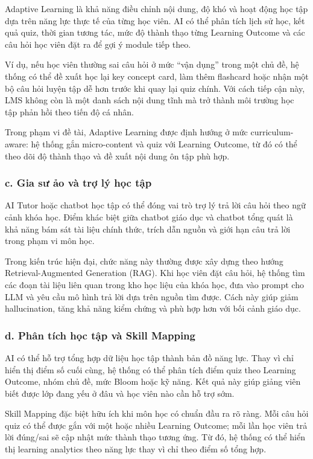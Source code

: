 Adaptive Learning là khả năng điều chỉnh nội dung, độ khó và hoạt động học tập
dựa trên năng lực thực tế của từng học viên. AI có thể phân tích lịch sử học,
kết quả quiz, thời gian tương tác, mức độ thành thạo từng Learning Outcome và
các câu hỏi học viên đặt ra để gợi ý module tiếp theo.

Ví dụ, nếu học viên thường sai câu hỏi ở mức ``vận dụng'' trong một chủ đề, hệ
thống có thể đề xuất học lại key concept card, làm thêm flashcard hoặc nhận một
bộ câu hỏi luyện tập dễ hơn trước khi quay lại quiz chính. Với cách tiếp cận
này, LMS không còn là một danh sách nội dung tĩnh mà trở thành môi trường học
tập phản hồi theo tiến độ cá nhân.

Trong phạm vi đề tài, Adaptive Learning được định hướng ở mức
curriculum-aware: hệ thống gắn micro-content và quiz với Learning Outcome, từ
đó có thể theo dõi độ thành thạo và đề xuất nội dung ôn tập phù hợp.

\subsubsection*{c. Gia sư ảo và trợ lý học tập}

AI Tutor hoặc chatbot học tập có thể đóng vai trò trợ lý trả lời câu hỏi theo
ngữ cảnh khóa học. Điểm khác biệt giữa chatbot giáo dục và chatbot tổng quát là
khả năng bám sát tài liệu chính thức, trích dẫn nguồn và giới hạn câu trả lời
trong phạm vi môn học.

Trong kiến trúc hiện đại, chức năng này thường được xây dựng theo hướng
Retrieval-Augmented Generation (RAG). Khi học viên đặt câu hỏi, hệ thống tìm
các đoạn tài liệu liên quan trong kho học liệu của khóa học, đưa vào prompt cho
LLM và yêu cầu mô hình trả lời dựa trên nguồn tìm được. Cách này giúp giảm
hallucination, tăng khả năng kiểm chứng và phù hợp hơn với bối cảnh giáo dục.

\subsubsection*{d. Phân tích học tập và Skill Mapping}

AI có thể hỗ trợ tổng hợp dữ liệu học tập thành bản đồ năng lực. Thay vì chỉ
hiển thị điểm số cuối cùng, hệ thống có thể phân tích điểm quiz theo Learning
Outcome, nhóm chủ đề, mức Bloom hoặc kỹ năng. Kết quả này giúp giảng viên biết
được lớp đang yếu ở đâu và học viên nào cần hỗ trợ sớm.

Skill Mapping đặc biệt hữu ích khi môn học có chuẩn đầu ra rõ ràng. Mỗi câu hỏi
quiz có thể được gắn với một hoặc nhiều Learning Outcome; mỗi lần học viên trả
lời đúng/sai sẽ cập nhật mức thành thạo tương ứng. Từ đó, hệ thống có thể hiển
thị learning analytics theo năng lực thay vì chỉ theo điểm số tổng hợp.

